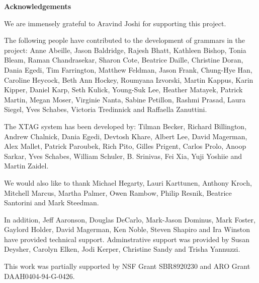 \pagestyle{plain}
\null\vfil
\begin{center}
{\bf Acknowledgements}
\end{center}
\setcounter{page}{0}

We are immensely grateful to Aravind Joshi for supporting this
project. 

The following people have contributed to the development of grammars in the
project: Anne Abeille, Jason Baldridge, Rajesh Bhatt, Kathleen Bishop, Tonia
Bleam, Raman Chandrasekar, Sharon Cote, Beatrice Daille, Christine Doran, Dania
Egedi, Tim Farrington, Matthew Feldman, Jason Frank, Chung-Hye Han, Caroline
Heycock, Beth Ann Hockey, Roumyana Izvorski, Martin Kappus, Karin Kipper,
Daniel Karp, Seth Kulick, Young-Suk Lee, Heather Matayek, Patrick Martin, Megan
Moser, Virginie Nanta, Sabine Petillon, Rashmi Prasad, Laura Siegel, Yves
Schabes, Victoria Tredinnick and Raffaella Zanuttini.

The XTAG system has been developed by: Tilman Becker, Richard
Billington, Andrew Chalnick, Dania Egedi, Devtosh Khare, Albert Lee,
David Magerman, Alex Mallet, Patrick Paroubek, Rich Pito, Gilles
Prigent, Carlos Prolo, Anoop Sarkar, Yves Schabes, William Schuler,
B. Srinivas, Fei Xia, Yuji Yoshiie and Martin Zaidel.

We would also like to thank Michael Hegarty, Lauri Karttunen, Anthony
Kroch, Mitchell Marcus, Martha Palmer, Owen Rambow, Philip Resnik,
Beatrice Santorini and Mark Steedman.

In addition, Jeff Aaronson, Douglas DeCarlo, Mark-Jason Dominus, Mark
Foster, Gaylord Holder, David Magerman, Ken Noble, Steven Shapiro and
Ira Winston have provided technical support.  Adminstrative support
was provided by Susan Deysher, Carolyn Elken, Jodi Kerper, Christine
Sandy and Trisha Yannuzzi.

This work was partially supported by  NSF Grant SBR8920230 and ARO Grant
DAAH0404-94-G-0426. 

\newpage

